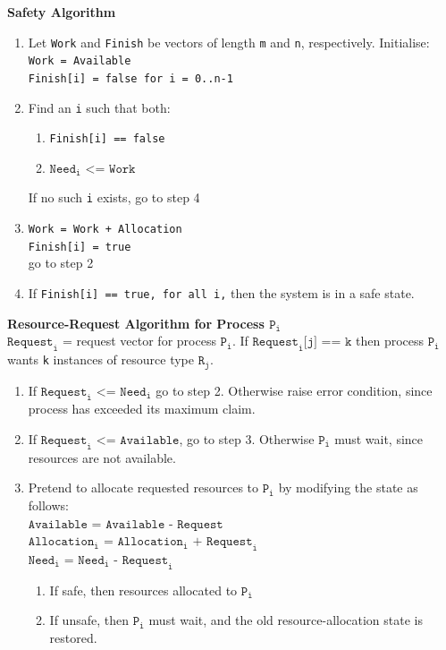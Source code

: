 \documentclass[11pt,a4paper]{article}
\begin{document}
\textbf{Safety Algorithm}
\begin{enumerate}
    \item Let \texttt{Work} and \texttt{Finish} be vectors of length \texttt{m} and \texttt{n},
        respectively.
        Initialise: \\
    \texttt{Work = Available} \\
    \texttt{Finish[i] = false for i = 0..n-1}
\item Find an \texttt{i} such that both:
    \begin{enumerate}
        \item \texttt{Finish[i] == false}
        \item $\texttt{Need}_\texttt{i} \texttt{ <= Work}$
    \end{enumerate}
    If no such \texttt{i} exists, go to step 4
\item \texttt{Work = Work + Allocation} \\
    \texttt{Finish[i] = true} \\
    go to step 2
\item If \texttt{Finish[i] == true, for all i,}
    then the system is in a safe state.
\end{enumerate}

\textbf{Resource-Request Algorithm for Process $\texttt{P}_\texttt{i}$} \\
$\texttt{Request}_\texttt{i}$ = request vector for process $\texttt{P}_\texttt{i}$.
If $\texttt{Request}_\texttt{i}\texttt{[j] == k}$
then process $\texttt{P}_\texttt{i}$ wants \texttt{k} instances of resource type
$\texttt{R}_\texttt{j}$.
\begin{enumerate}
    \item If $\texttt{Request}_\texttt{i} \texttt{ <= Need}_\texttt{i}$ go to step 2.
        Otherwise raise error condition, since process has exceeded its maximum claim.
    \item If $\texttt{Request}_\texttt{i} \texttt{ <= Available}$, go to step 3.
        Otherwise $\texttt{P}_\texttt{i}$ must wait, since resources are not available.
    \item Pretend to allocate requested resources to $\texttt{P}_\texttt{i}$ by modifying
        the state as follows: \\
        $\texttt{Available = Available - Request}$ \\
        $\texttt{Allocation}_\texttt{i} \texttt{ =
        Allocation}_\texttt{i} \texttt{ + Request}_\texttt{i}$ \\
        $\texttt{Need}_\texttt{i} \texttt{ = Need}_\texttt{i} \texttt{ - Request}_\texttt{i}$
        \begin{enumerate}
            \item If safe, then resources allocated to $\texttt{P}_\texttt{i}$
            \item If unsafe, then $\texttt{P}_\texttt{i}$ must wait,
                and the old resource-allocation state is restored.
        \end{enumerate}
\end{enumerate}
\end{document}
